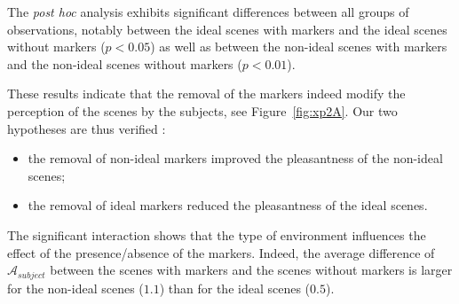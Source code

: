 \documentclass[12pt]{elsarticle}
\begin{document}
The \emph{post hoc} analysis exhibits significant differences between all groups of observations, notably between the ideal scenes with markers and the ideal scenes without markers ($p<0.05$) as well as between the non-ideal scenes with markers and the non-ideal scenes without markers ($p<0.01$).


These results indicate that the removal of the markers indeed modify the perception of the scenes by the subjects, see Figure~\ref{fig:xp2A}. Our two hypotheses are thus verified :



\begin{itemize}
\item the removal of non-ideal markers improved the pleasantness of the non-ideal scenes;
\item the removal of ideal markers reduced the pleasantness of the ideal scenes.
\end{itemize}


The significant interaction shows that the type of environment influences the effect of the presence/absence of the markers. Indeed, the average difference of $\mathcal{A}_{subject}$ between the scenes with markers and the scenes without markers is larger for the non-ideal scenes ($1.1$) than for the ideal scenes ($0.5$).

\end{document}
